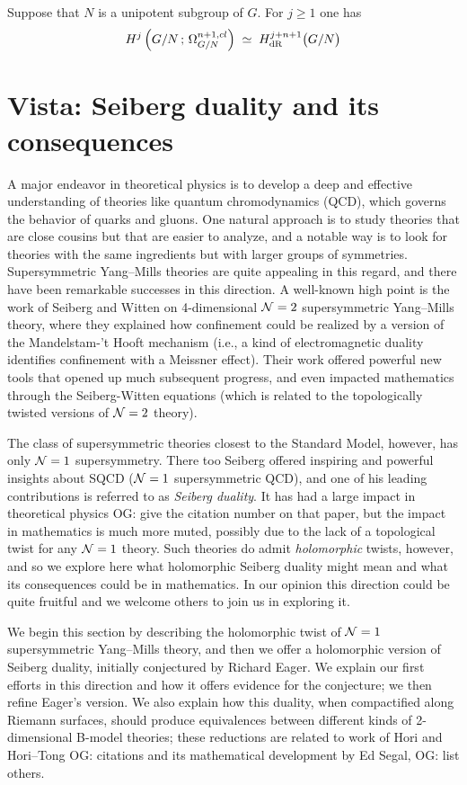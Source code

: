 \documentclass[11pt]{amsart}
\def\owen#1{{\textcolor{violet!65!black}{OG: {#1}}}}
\begin{document}
Suppose that $N$ is a unipotent subgroup of $G$.
For $j \geq 1$ one has
\[
H^j \left( G / N \, ; \, \Omega^{n+1,cl}_{G/N} \right) \; \simeq \; H_{\rm dR}^{j+n+1} \big(G / N \big)
\]


\section{Vista: Seiberg duality and its consequences}
\label{sec: seiberg}

A major endeavor in theoretical physics is to develop a deep and effective understanding of theories like quantum chromodynamics (QCD), which governs the behavior of quarks and gluons.
One natural approach is to study theories that are close cousins but that are easier to analyze,
and a notable way is to look for theories with the same ingredients but with larger groups of symmetries.
Supersymmetric Yang--Mills theories are quite appealing in this regard,
and there have been remarkable successes in this direction.
A well-known high point is the work of Seiberg and Witten on 4-dimensional $\mathcal N =2$ supersymmetric Yang--Mills theory,
where they explained how confinement could be realized by a version of the Mandelstam-'t Hooft mechanism (i.e., a kind of electromagnetic duality identifies confinement with a Meissner effect).
Their work offered powerful new tools that opened up much subsequent progress,
and even impacted mathematics through the Seiberg-Witten equations (which is related to the topologically twisted versions of $\mathcal N=2$ theory).

The class of supersymmetric theories closest to the Standard Model, however, has only $\mathcal N=1$ supersymmetry.
There too Seiberg offered inspiring and powerful insights about SQCD ($\mathcal N=1$ supersymmetric QCD),
and one of his leading contributions is referred to as {\em Seiberg duality}.
It has had a large impact in theoretical physics \owen{give the citation number on that paper},
but the impact in mathematics is much more muted,
possibly due to the lack of a topological twist for any $\mathcal N=1$ theory.
Such theories do admit {\em holomorphic} twists, however, 
and so we explore here what holomorphic Seiberg duality might mean and what its consequences could be in mathematics.
In our opinion this direction could be quite fruitful and we welcome others to join us in exploring it.

We begin this section by describing the holomorphic twist of $\mathcal N=1$ supersymmetric Yang--Mills theory,
and then we offer a holomorphic version of Seiberg duality, 
initially conjectured by Richard Eager.
We explain our first efforts in this direction and how it offers evidence for the conjecture;
we then refine Eager's version.
We also explain how this duality, when compactified along Riemann surfaces,
should produce equivalences between different kinds of 2-dimensional B-model theories;
these reductions are related to work of Hori and Hori--Tong \owen{citations} and its mathematical development by Ed Segal, \owen{list others}.
\end{document}

